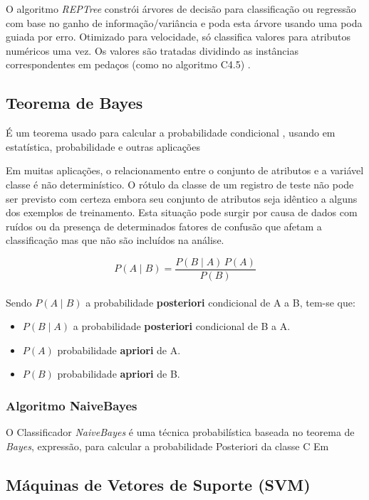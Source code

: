 \documentclass[
	12pt,				%
	openright,			%
	oneside,	
	a4paper,				%
	english,				%
	brazil				%
]{abntex2/abntex2} %
\begin{document}
	O algoritmo \textit{REPTree} constrói árvores de decisão para classificação ou regressão  com base no ganho de informação/variância e poda esta árvore usando uma poda guiada por erro. Otimizado para velocidade, só classifica valores para atributos numéricos uma vez. Os valores são tratadas dividindo as instâncias correspondentes em pedaços (como no algoritmo C4.5) \cite{witten:2011}.
			
	\subsection{Teorema de Bayes}
	
	É um teorema usado para calcular a probabilidade condicional , usando em estatística, probabilidade e outras aplicações
	
	Em muitas aplicações, o relacionamento entre o conjunto de atributos e a variável classe é não determinístico. O rótulo da classe de um registro de teste não pode ser previsto com certeza embora seu conjunto de atributos seja idêntico a alguns dos exemplos de treinamento. Esta situação pode surgir por causa de dados com ruídos ou da presença de determinados fatores de confusão que afetam a classificação mas que não são incluídos na análise.
	
	\begin{equation}
		 P(A \mid B) = \frac{P(B \mid A) \, P(A)}{P(B)} 
	\end{equation}
	\\
	Sendo $ P(A\mid B) $ a probabilidade \textbf{posteriori} condicional de A a B, tem-se que:
	\begin{itemize}
		\item $P(B \mid A) $ a probabilidade \textbf{posteriori} condicional de B a A.
		\item $P(A) $ probabilidade \textbf{apriori} de A.
		\item $P(B )$ probabilidade \textbf{apriori} de B.
	\end{itemize}
	\subsubsection{Algoritmo NaiveBayes}
	O Classificador \textit{NaiveBayes} é uma técnica probabilística baseada no teorema de \textit{Bayes}, expressão, para calcular a probabilidade Posteriori da classe C
	Em \cite{john:1995}
	
	\subsection{Máquinas de Vetores de Suporte (SVM)}
	
\end{document}
